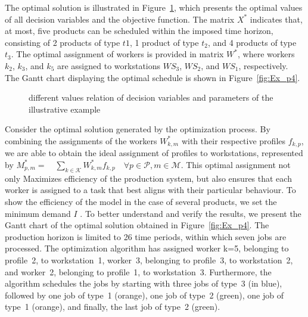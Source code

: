 \documentclass[review,12pt, 3p, times]{elsarticle}
\begin{document}
The optimal solution is illustrated in Figure~\ref{fig:Ex_p3}, which presents the optimal values of all decision variables and the objective function. The matrix $X^*$ indicates that, at most, five products can be scheduled within the imposed time horizon, consisting of 2 products of type $t1$, 1 product of type $t_2$, and 4 products of type $t_3$. The optimal assignment of workers is provided in matrix $W^*$, where workers $k_2$, $k_3$, and $k_5$ are assigned to workstations $\textit{WS}_3$, $\textit{WS}_2$, and $\textit{WS}_1$, respectively. The Gantt chart displaying the optimal schedule is shown in Figure~\ref{fig:Ex_p4}.
			
\begin{figure}[htbp]
	\centering
	\caption{different values relation of decision variables and parameters of the illustrative example }
	
	\label{fig:Ex_p3}
\end{figure}
					
Consider the optimal solution generated by the optimization process. By combining the assignments of the workers $W^*_{k,m}$ with their respective profiles $f_{k,p}$, we are able to obtain the ideal assignment of profiles to workstations, represented by \quad $M^*_{p,m}=\quad \sum_{k \in \mathcal{K}} W^*_{k,m} f_{k,p} \quad \forall{p\in \mathcal{P},m \in \mathcal{M}} $. This optimal assignment not only Maximizes efficiency of the production system, but also ensures that each worker is assigned to a task that best aligns with their particular behaviour. To show the efficiency of the model in the case of several products, we set the minimum demand $I$ . 
To better understand and verify the results, we present the Gantt chart of the optimal solution obtained in Figure~\ref{fig:Ex_p4}. The production horizon is limited to 26 time periods, within which seven jobs are processed. The optimization algorithm has assigned worker k=5, belonging to profile~2, to workstation~1, worker~3, belonging to profile~3, to workstation~2, and worker~2, belonging to profile~1, to workstation~3. Furthermore, the algorithm schedules the jobs by starting with three jobs of type~3 (in blue), followed by one job of type~1 (orange), one job of type~2 (green), one job of type~1 (orange), and finally, the last job of type~2 (green).
	
\end{document}
